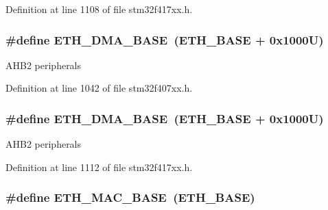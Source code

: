 Definition at line 1108 of file stm32f417xx.\+h.

\subsubsection[{\texorpdfstring{E\+T\+H\+\_\+\+D\+M\+A\+\_\+\+B\+A\+SE}{ETH_DMA_BASE}}]{\setlength{\rightskip}{0pt plus 5cm}\#define E\+T\+H\+\_\+\+D\+M\+A\+\_\+\+B\+A\+SE~({\bf E\+T\+H\+\_\+\+B\+A\+SE} + 0x1000\+U)}\hypertarget{group___peripheral__registers__structures_gace2114e1b37c1ba88d60f3e831b67e93}{}\label{group___peripheral__registers__structures_gace2114e1b37c1ba88d60f3e831b67e93}
A\+H\+B2 peripherals 

Definition at line 1042 of file stm32f407xx.\+h.

\subsubsection[{\texorpdfstring{E\+T\+H\+\_\+\+D\+M\+A\+\_\+\+B\+A\+SE}{ETH_DMA_BASE}}]{\setlength{\rightskip}{0pt plus 5cm}\#define E\+T\+H\+\_\+\+D\+M\+A\+\_\+\+B\+A\+SE~({\bf E\+T\+H\+\_\+\+B\+A\+SE} + 0x1000\+U)}\hypertarget{group___peripheral__registers__structures_gace2114e1b37c1ba88d60f3e831b67e93}{}\label{group___peripheral__registers__structures_gace2114e1b37c1ba88d60f3e831b67e93}
A\+H\+B2 peripherals 

Definition at line 1112 of file stm32f417xx.\+h.

\subsubsection[{\texorpdfstring{E\+T\+H\+\_\+\+M\+A\+C\+\_\+\+B\+A\+SE}{ETH_MAC_BASE}}]{\setlength{\rightskip}{0pt plus 5cm}\#define E\+T\+H\+\_\+\+M\+A\+C\+\_\+\+B\+A\+SE~({\bf E\+T\+H\+\_\+\+B\+A\+SE})}\hypertarget{group___peripheral__registers__structures_ga3cf7005808feb61bff1fee01e50a711a}{}\label{group___peripheral__registers__structures_ga3cf7005808feb61bff1fee01e50a711a}


